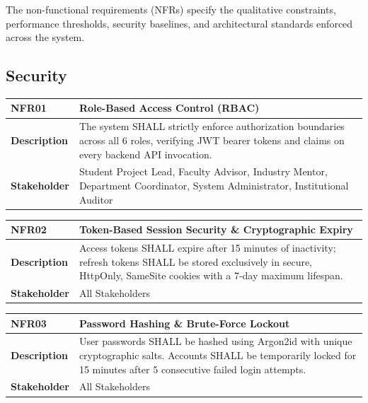 The non-functional requirements (NFRs) specify the qualitative constraints, performance thresholds, security baselines, and architectural standards enforced across the system.

\subsection{Security}
\label{subsec:nfr_security}

\begin{table}[H]
\centering
\small
\begin{tabularx}{\textwidth}{|l|X|}
\hline
\rowcolor{lightgray!40} \textbf{NFR01} & \textbf{Role-Based Access Control (RBAC)} \\ \hline
\textbf{Description} & The system SHALL strictly enforce authorization boundaries across all 6 roles, verifying JWT bearer tokens and claims on every backend API invocation. \\ \hline
\textbf{Stakeholder} & Student Project Lead, Faculty Advisor, Industry Mentor, Department Coordinator, System Administrator, Institutional Auditor \\ \hline
\end{tabularx}
\end{table}

\begin{table}[H]
\centering
\small
\begin{tabularx}{\textwidth}{|l|X|}
\hline
\rowcolor{lightgray!40} \textbf{NFR02} & \textbf{Token-Based Session Security \& Cryptographic Expiry} \\ \hline
\textbf{Description} & Access tokens SHALL expire after 15 minutes of inactivity; refresh tokens SHALL be stored exclusively in secure, HttpOnly, SameSite cookies with a 7-day maximum lifespan. \\ \hline
\textbf{Stakeholder} & All Stakeholders \\ \hline
\end{tabularx}
\end{table}

\begin{table}[H]
\centering
\small
\begin{tabularx}{\textwidth}{|l|X|}
\hline
\rowcolor{lightgray!40} \textbf{NFR03} & \textbf{Password Hashing \& Brute-Force Lockout} \\ \hline
\textbf{Description} & User passwords SHALL be hashed using Argon2id with unique cryptographic salts. Accounts SHALL be temporarily locked for 15 minutes after 5 consecutive failed login attempts. \\ \hline
\textbf{Stakeholder} & All Stakeholders \\ \hline
\end{tabularx}
\end{table}

